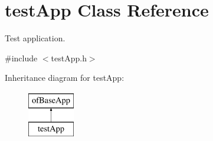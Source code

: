 \hypertarget{classtest_app}{\section{test\-App Class Reference}
\label{classtest_app}
}


Test application.  




{\ttfamily \#include $<$test\-App.\-h$>$}

Inheritance diagram for test\-App\-:\begin{figure}[H]
\begin{center}
\leavevmode
\includegraphics[height=2.000000cm]{classtest_app}
\end{center}
\end{figure}
